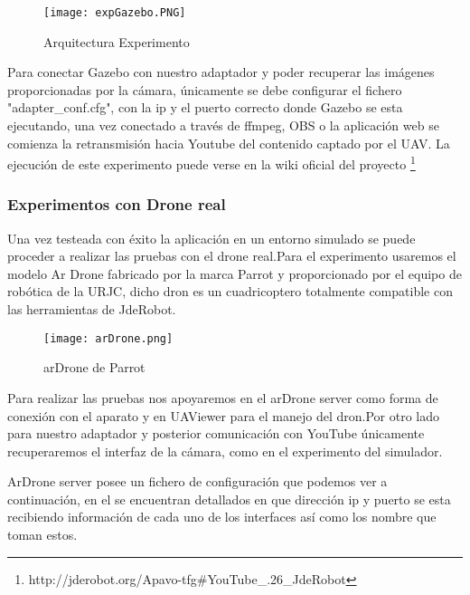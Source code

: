   \begin{figure}[H]
        \centering
        \texttt{[image: expGazebo.PNG]}
        \caption{Arquitectura Experimento}
    \end{figure}

Para conectar Gazebo con nuestro adaptador y poder recuperar las imágenes proporcionadas por la cámara, únicamente se debe configurar el fichero "adapter\_conf.cfg", con la ip y el puerto correcto donde Gazebo se esta ejecutando, una vez conectado a través de ffmpeg, OBS o la aplicación web se comienza la retransmisión hacia Youtube del contenido captado por el UAV.
La ejecución de este experimento puede verse en la wiki oficial del proyecto \footnote{http://jderobot.org/Apavo-tfg#YouTube_.26_JdeRobot}

\subsubsection{Experimentos con Drone real}

Una vez testeada con éxito la aplicación en un entorno simulado se puede proceder a realizar las pruebas con el drone real.Para el experimento usaremos el modelo Ar Drone fabricado por la marca Parrot y proporcionado por el equipo de robótica de la URJC, dicho dron es un cuadricoptero totalmente compatible con las herramientas de JdeRobot.

  \begin{figure}[H]
        \centering
        \texttt{[image: arDrone.png]}
        \caption{arDrone de Parrot}
    \end{figure}

Para realizar las pruebas nos apoyaremos en el arDrone server como forma de conexión con el aparato y en UAViewer para el manejo del dron.Por otro lado para nuestro adaptador y posterior comunicación con YouTube únicamente recuperaremos el interfaz de la cámara, como en el experimento del simulador.

ArDrone server posee un fichero de configuración que podemos ver a continuación, en el se encuentran detallados en que dirección ip y puerto se esta recibiendo información de cada uno de los interfaces así como los nombre que toman estos.

